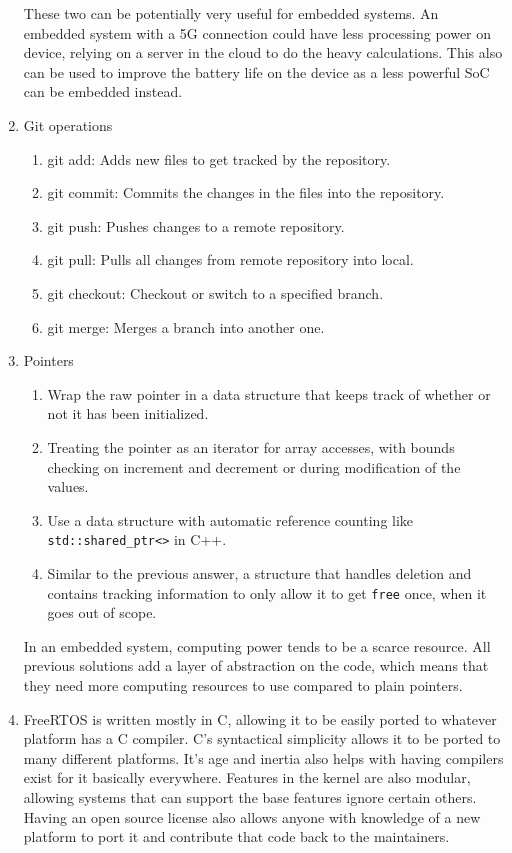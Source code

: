 \documentclass{article}
\begin{document}
\begin{enumerate}
These two can be potentially very useful for embedded systems. An embedded system with a 5G connection could have less processing power on device, relying on a server in the cloud to do the heavy calculations. This also can be used to improve the battery life on the device as a less powerful SoC can be embedded instead.
\item Git operations
\begin{enumerate}
    \item git add: Adds new files to get tracked by the repository.
    \item git commit: Commits the changes in the files into the repository.
    \item git push: Pushes changes to a remote repository.
    \item git pull: Pulls all changes from remote repository into local.
    \item git checkout: Checkout or switch to a specified branch.
    \item git merge: Merges a branch into another one.
\end{enumerate}
\item Pointers
\begin{enumerate}
    \item Wrap the raw pointer in a data structure that keeps track of whether or not it has been initialized.
    \item Treating the pointer as an iterator for array accesses, with bounds checking on increment and decrement or during modification of the values.
    \item Use a data structure with automatic reference counting like \verb|std::shared_ptr<>| in C++.
    \item Similar to the previous answer, a structure that handles deletion and contains tracking information to only allow it to get \verb|free| once, when it goes out of scope.
\end{enumerate}
In an embedded system, computing power tends to be a scarce resource. All previous solutions add a layer of abstraction on the code, which means that they need more computing resources to use compared to plain pointers.
\item FreeRTOS is written mostly in C, allowing it to be easily ported to whatever platform has a C compiler. C's syntactical simplicity allows it to be ported to many different platforms. It's age and inertia also helps with having compilers exist for it basically everywhere. Features in the kernel are also modular, allowing systems that can support the base features ignore certain others. Having an open source license also allows anyone with knowledge of a new platform to port it and contribute that code back to the maintainers.

\end{enumerate}
\end{document}
